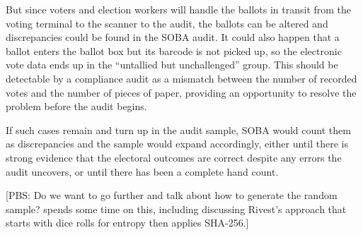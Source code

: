 But since voters and election workers will handle the ballots in transit from the voting terminal to the scanner to the audit, the ballots can be altered and discrepancies could be found in the SOBA audit.
It could also happen that a ballot enters the ballot box but its barcode is not
picked up, so the electronic vote data ends up in the ``untallied but unchallenged'' group.
This should be detectable by a compliance audit \citep{benalohEtal11,lindemanStark12,starkWagner12} 
as a mismatch between the number of recorded votes and the number of pieces of paper,
providing an opportunity to resolve the problem before the audit begins.

If such cases remain and turn up in the audit sample, SOBA would count them as discrepancies 
and the sample would expand accordingly, either
until there is strong evidence that the electoral outcomes are correct despite any errors the audit
uncovers, or until there has been a complete hand count.

[PBS:  Do we want to go further and talk about how to generate the random sample?  \cite{lindemanStark12}
spends some time on this, including discussing Rivest's approach that starts with dice rolls for entropy then
applies SHA-256.]

